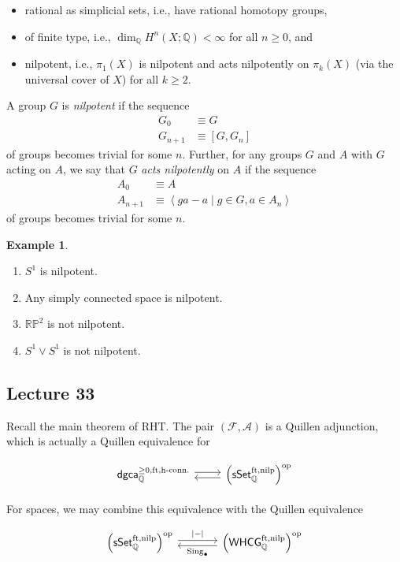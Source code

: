 \documentclass[10pt,letterpaper,cm]{nupset}
\theoremstyle{definition}
\newtheorem{exmp}[defn]{Example}
\theoremstyle{theorem}
\theoremstyle{remark}
\newcommand{\A}{\mathcal A}
\newcommand{\F}{\mathcal F}
\newcommand{\Q}{\mathbb Q}
\newcommand{\RP}{\mathbb{RP}}
\newcommand{\1}{\mathbb{1}}
\newcommand{\dgca}{\mathsf{dgca}}
\newcommand{\0}{\vec 0}
\DeclareMathOperator{\ft}{ft}
\DeclareMathOperator{\nilp}{nilp}
\DeclareMathOperator{\op}{op}
\DeclareMathOperator{\sing}{Sing}
\newcommand{\bi}{\begin{itemize}}
\newcommand{\ei}{\end{itemize}}
\newcommand{\be}{\begin{enumerate}}
\newcommand{\ee}{\end{enumerate}}
\begin{document}
\bi
\item rational as simplicial sets, i.e., have rational homotopy groups,
\item of finite type, i.e., $\dim_{\Q}H^n(X;\Q) < \infty$ for all $n \geq 0$, and
\item nilpotent, i.e., $\pi_1(X)$ is nilpotent and acts nilpotently on $\pi_k(X)$ (via the universal cover of $X$) for all $k \geq 2$.
\ei

A group $G$ is \textit{nilpotent} if the sequence
\begin{align*}
G_0 &  \equiv G
\\ G_{n+1} & \equiv \left[G, G_n\right] 
\end{align*}
of groups becomes trivial for some $n$. Further, for any groups $G$ and $A$ with $G$ acting on $A$, we say that $G$ \textit{acts nilpotently} on $A$  if the sequence 
\begin{align*}
A_0 & \equiv A
\\ A_{n+1} & \equiv  \left\langle{ga - a \mid g \in G, a \in A_n}\right\rangle
\end{align*}
of groups becomes trivial for some $n$.


\begin{exmp} $ $
\be
\item $S^1$ is nilpotent.
\item Any simply connected space is nilpotent.
\item $\RP^2$ is not nilpotent.
\item $S^1 \vee S^1$ is not nilpotent.
\ee
\end{exmp}

\subsection{Lecture 33}

Recall the main theorem of RHT. The pair $\left(\F, \A\right)$ is a Quillen adjunction, which is actually a Quillen equivalence for

\[
\begin{tikzcd}
	{\dgca_{\Q}^{\geq 0, \ft, \text{h-conn.}}} & {\left(\mathsf{sSet}_{\Q}^{\ft, \nilp}\right)^{\op}}
	\arrow[shift left=1, from=1-1, to=1-2]
	\arrow[shift left=1, from=1-2, to=1-1]
\end{tikzcd}
\]

For spaces, we may combine this equivalence with the Quillen equivalence

\[
\begin{tikzcd}[column sep=large]
	{\left(\mathsf{sSet}_{\Q}^{\ft, \nilp}\right)^{\op}} & {\left(\mathsf{WHCG}_{\Q}^{\ft, \nilp}\right)^{\op}}
	\arrow["{\left\lvert{-}\right\rvert}", shift left=1, from=1-1, to=1-2]
	\arrow["{\sing_{\bullet}}", shift left=1, from=1-2, to=1-1]
\end{tikzcd}
\]
\end{document}
